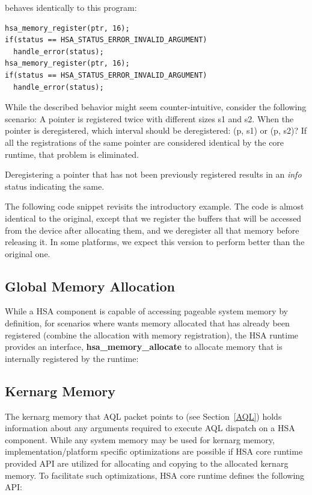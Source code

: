 \documentclass[draft]{book}
\newcommand{\reffun}[1]{\textbf{#1}}
\begin{document}
behaves identically to this program:

\begin{lstlisting}
hsa_memory_register(ptr, 16);
if(status == HSA_STATUS_ERROR_INVALID_ARGUMENT)
  handle_error(status);
hsa_memory_register(ptr, 16);
if(status == HSA_STATUS_ERROR_INVALID_ARGUMENT)
  handle_error(status);
\end{lstlisting}

While the described behavior might seem counter-intuitive, consider the
following scenario: A pointer is registered twice with different sizes s1 and
s2. When the pointer is deregistered, which interval should be deregistered: (p,
s1) or (p, s2)? If all the registrations of the same pointer are considered
identical by the core runtime, that problem is eliminated.

Deregistering a pointer that has not been previously registered results in an
\emph{info} status indicating the same.

The following code snippet revisits the introductory example. The code is almost
identical to the original, except that we register the buffers that will be
accessed from the device after allocating them, and we deregister all that
memory before releasing it. In some platforms, we expect this version to perform
better than the original one.


\hypertarget{globalmemory}{}\subsection{Global  Memory Allocation}\label{globalmemory}

While a HSA component is capable of accessing pageable system memory by
definition, for scenarios where wants memory allocated that has already been
registered (combine the allocation with memory registration), the HSA runtime
provides an interface, \reffun{hsa_memory_allocate} to allocate memory that is
internally registered by the runtime:



\hypertarget{kernarg}{}\subsection{Kernarg Memory}\label{kernargmem}

The kernarg memory that AQL packet points to (see Section~\ref{AQL}) holds
information about any arguments required to execute AQL dispatch on a HSA
component. While any system memory may be used for kernarg memory,
implementation/platform specific optimizations are possible if HSA core runtime
provided API are utilized for allocating and copying to the allocated kernarg
memory. To facilitate such optimizations, HSA core runtime defines the following
API:
\end{document}
